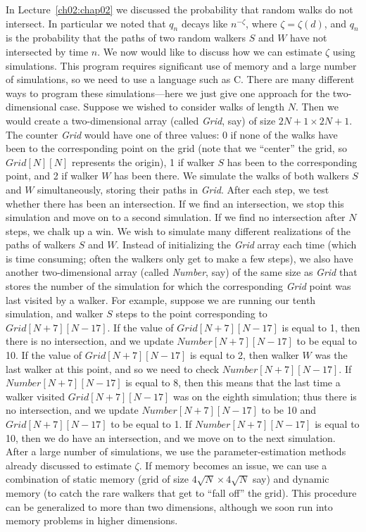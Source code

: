 \documentclass{stml-l}
\theoremstyle{definition}
\numberwithin{equation}{chapter}
\numberwithin{figure}{chapter}
\numberwithin{figure}{section}
\begin{document}
In Lecture~\ref{ch02:chap02} we discussed the probability that random
walks do not intersect. In particular we noted that $q_{n}$ decays
like $n^{-\zeta}$, where $\zeta=\zeta(d)$, and $q_{n}$ is the
probability that the paths of two random walkers $S$ and $W$ have
not intersected by time $n$. We now would like to discuss how we can
estimate $\zeta$ using simulations. This program requires
significant use of memory and a large number of simulations, so we
need to use a language such as C. There are many different ways to
program these simulations---here we just give one approach for the
two-dimensional case. Suppose we wished to consider walks of length
$N$. Then we would create a two-dimensional array (called
\emph{Grid}, say) of size $2N+1\times 2N+1$. The counter \emph{Grid}
would have one of three values: $0$ if none of the walks have been
to the corresponding point on the grid (note that we ``center'' the
grid, so $Grid[N][N]$ represents the origin), 1 if walker $S$ has
been to the corresponding point, and 2 if walker $W$ has been there.
We simulate the walks of both walkers $S$ and $W$ simultaneously,
storing their paths in \emph{Grid}. After each step, we test whether
there has been an intersection. If we find an intersection, we stop
this simulation and move on to a second simulation. If we find no
intersection after $N$ steps, we chalk up a win. We wish to simulate
many different realizations of the paths of walkers $S$ and $W$.
Instead of initializing the \emph{Grid} array each time (which is
time consuming; often the walkers only get to make a few steps), we
also have another two-dimensional array (called \emph{Number}, say)
of the same size as \emph{Grid} that stores the number of the
simulation for which the corresponding \emph{Grid} point was last
visited by a walker. For example, suppose we are running our tenth
simulation, and walker $S$ steps to the point corresponding to
$Grid[N+7][N-17]$. If the value of $Grid[N+7][N-17]$ is equal to 1,
then there is no intersection, and we update $Number[N+7][N-17]$ to
be equal to 10. If the value of $Grid[N+7][N-17]$ is equal to 2,
then walker $W$ was the last walker at this point, and so we need to
check $Number[N+7][N-17]$. If $Number[N+7][N-17]$ is equal to 8,
then this means that the last time a walker visited
$Grid[N+7][N-17]$ was on the eighth simulation; thus there is no
intersection, and we update $Number[N+7][N-17]$ to be 10 and
$Grid[N+7][N-17]$ to be equal to 1. If $Number[N+7][N-17]$ is equal
to 10, then we do have an intersection, and we move on to the next
simulation. After a large number of simulations, we use the
parameter-estimation methods already discussed to estimate $\zeta$.
If memory becomes an issue, we can use a combination of static
memory (grid of size $4\sqrt{N}\times 4\sqrt{N}$ say) and dynamic
memory (to catch the rare walkers that get to ``fall off'' the
grid). This procedure can be generalized to more than two
dimensions, although we soon run into memory problems in higher
dimensions.
\end{document}

